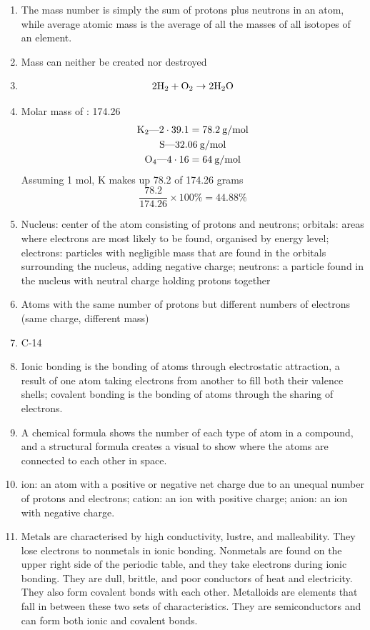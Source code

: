 \documentclass[a4paper, 12pt]{article}
\newcommand{\lab}[1]{\: \text{#1}}
\begin{document}
\begin{enumerate}[label=\alph*.]
\item The mass number is simply the sum of protons plus neutrons in an atom, while average atomic mass is the average of all the masses of all isotopes of an element.  
\item Mass can neither be created nor destroyed
\item
\begin{gather*}
2\ce{H2} + \ce{O2} \to 2\ce{H2O} \\
\end{gather*}
\item Molar mass of : 174.26 \lab{g/mol}
\begin{gather*}
\ce{K2}\text{---}2 \cdot 39.1 = 78.2 \lab{g/mol} \\
\ce{S}\text{---}32.06 \lab{g/mol} \\
\ce{O4}\text{---}4 \cdot 16 = 64 \lab{g/mol}
\end{gather*}
Assuming 1 mol, K makes up 78.2 of 174.26 grams
\[\frac{78.2}{174.26} \times 100\% = \boxed{44.88 \%}\]
\item Nucleus: center of the atom consisting of protons and neutrons; orbitals: areas where electrons are most likely to be found, organised by energy level; electrons: particles with negligible mass that are found in the orbitals surrounding the nucleus, adding negative charge; neutrons: a particle found in the nucleus with neutral charge holding protons together
\item Atoms with the same number of protons but different numbers of electrons (same charge, different mass)
\item C-14
\item Ionic bonding is the bonding of atoms through electrostatic attraction, a result of one atom taking electrons from another to fill both their valence shells; covalent bonding is the bonding of atoms through the sharing of electrons.
\item A chemical formula shows the number of each type of atom in a compound, and a structural formula creates a visual to show where the atoms are connected to each other in space.
\item ion: an atom with a positive or negative net charge due to an unequal number of protons and electrons; cation: an ion with positive charge; anion: an ion with negative charge.
\item Metals are characterised by high conductivity, lustre, and malleability. They lose electrons to nonmetals in ionic bonding. Nonmetals are found on the upper right side of the periodic table, and they take electrons during ionic bonding. They are dull, brittle, and poor conductors of heat and electricity. They also form covalent bonds with each other. Metalloids are elements that fall in between these two sets of characteristics. They are semiconductors and can form both ionic and covalent bonds.

\end{enumerate}
\end{document}
